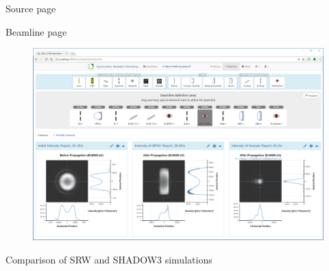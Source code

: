 \documentclass[final]{beamer}
\newlength{\twocolwid}
\begin{document}
\begin{frame}[t]
\begin{columns}[t]
\begin{column}{\twocolwid}
\begin{block}{\faLightbulbO{} Source page}
\end{block} 

\begin{block}{\faSignOut{} \faEllipsisH{} \faBullseye{} Beamline page}
\vspace{-1.0cm}

\begin{figure}
\includegraphics[width=0.95\linewidth]{images/beamline_page.png}
\end{figure}

\end{block}


\begin{block}{\faSpinner{} Comparison of SRW and SHADOW3 simulations}


\end{block}
\end{column}
\end{columns}
\end{frame}
\end{document}

